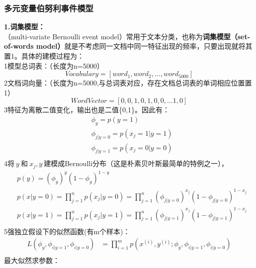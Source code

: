 \subsubsection{多元变量伯努利事件模型}%
\noindent\textbf{1.词集模型：}\\
（multi-variate Bernoulli event model）常用于文本分类，也称为\textbf{词集模型（set-of-words model）}就是不考虑同一文档中同一特征出现的频率，只要出现就将其置1。具体的建模过程为：\\
\textcircled{\footnotesize{1}}模型总词表：（长度为n=5000）
$$Vocabulary=[word_1,word_2,...,word_{5000}]$$
\textcircled{\footnotesize{2}}文档词向量：（长度为n=5000,与总词表对应，存在文档总词表的单词相应位置置1）
$$WordVector=[0,0,1,0,1,0,0,...1,0]$$
\textcircled{\footnotesize{3}}特征为离散二值变化，输出也是二值\{0,1\}。因此有：
\begin{equation}\nonumber
\begin{split}
  &\phi_y=p(y=1)\\
  &\phi_{j|y=0}=p(x_j=1|y=1)\\
  &\phi_{j|y=1}=p(x_j=0|y=0)\\
\end{split}
\end{equation}
\textcircled{\footnotesize{4}}将$~y~$和$~x_j,y~$建模成Bernoulli分布（这是朴素贝叶斯最简单的特例之一），
\begin{equation}\nonumber
\begin{split}
  &p(y)=(\phi_y)^y(1-\phi_y)^{1-y}\\
  &p(x|y=0)=\prod_{j=1}^{n}p(x_j|y=0)=\prod_{j=1}^{n}(\phi_{j|y=0})^{x_j}(1-\phi_{j|y=0})^{1-x_j}\\
  &p(x|y=1)=\prod_{j=1}^{n}p(x_j|y=1)=\prod_{j=1}^{n}(\phi_{j|y=1})^{x_j}(1-\phi_{j|y=1})^{1-x_j}\\
\end{split}
\end{equation}
\textcircled{\footnotesize{5}}强独立假设下的似然函数(有m个样本)：
\begin{equation}\nonumber
\begin{split}
  L(\phi_y,\phi_{i|y=1},\phi_{i|y=0})&=\prod_{i=1}^{m}p(x^{(i)},y^{(i)};\phi_y,\phi_{i|y=1},\phi_{i|y=0})\\
\end{split}
\end{equation}
{最大似然求参数：}
